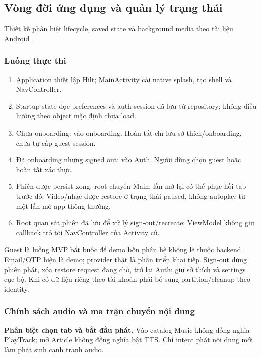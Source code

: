 \subsection{Vòng đời ứng dụng và quản lý trạng thái}
\label{sec:lifecycle-state}

Thiết kế phân biệt lifecycle, saved state và background media theo tài liệu Android~\cite{android-lifecycle,android-state,media3-background}.

\subsubsection{Luồng thực thi}
\label{sec:execution-flow}

\begin{enumerate}
\item Application thiết lập Hilt; MainActivity cài native splash, tạo shell và NavController.
\item Startup state đọc preferences và auth session đã lưu từ repository; không điều hướng theo object mặc định chưa load.
\item Chưa onboarding: vào onboarding. Hoàn tất chỉ lưu sở thích/onboarding, chưa tự cấp guest session.
\item Đã onboarding nhưng signed out: vào Auth. Người dùng chọn guest hoặc hoàn tất xác thực.
\item Phiên được persist xong: root chuyển Main; lần mở lại có thể phục hồi tab trước đó. Video/nhạc được restore ở trạng thái paused, không autoplay từ một lần mở app thông thường.
\item Root quan sát phiên đã lưu để xử lý sign-out/recreate; ViewModel không giữ callback trỏ tới NavController của Activity cũ.
\end{enumerate}

Guest là luồng MVP bắt buộc để demo bốn phân hệ không lệ thuộc backend. Email/OTP hiện là demo; provider thật là phần triển khai tiếp. Sign-out dừng phiên phát, xóa restore request đang chờ, trở lại Auth; giữ sở thích và settings cục bộ. Khi có dữ liệu riêng theo tài khoản phải bổ sung partition/cleanup theo identity.

\subsubsection{Chính sách audio và ma trận chuyển nội dung}
\label{sec:multitasking-matrix}

\textbf{Phân biệt chọn tab và bắt đầu phát.} Vào catalog Music không đồng nghĩa PlayTrack; mở Article không đồng nghĩa bật TTS. Chỉ intent phát nội dung mới làm phát sinh cạnh tranh audio.

